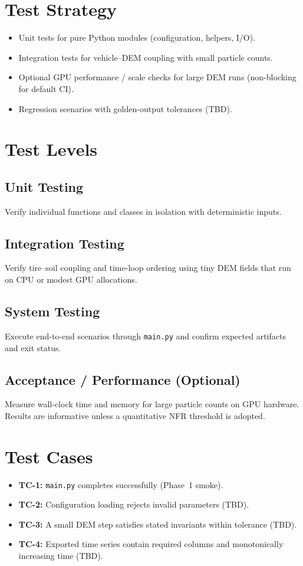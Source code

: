 \documentclass[conference]{IEEEtran}
\begin{document}
\section{Test Strategy}
\begin{itemize}
  \item Unit tests for pure Python modules (configuration, helpers, I/O).
  \item Integration tests for vehicle--DEM coupling with small particle counts.
  \item Optional GPU performance / scale checks for large DEM runs (non-blocking
        for default CI).
  \item Regression scenarios with golden-output tolerances (TBD).
\end{itemize}

\section{Test Levels}

\subsection{Unit Testing}
Verify individual functions and classes in isolation with deterministic inputs.

\subsection{Integration Testing}
Verify tire--soil coupling and time-loop ordering using tiny DEM fields that
run on CPU or modest GPU allocations.

\subsection{System Testing}
Execute end-to-end scenarios through \texttt{main.py} and confirm expected
artifacts and exit status.

\subsection{Acceptance / Performance (Optional)}
Measure wall-clock time and memory for large particle counts on GPU hardware.
Results are informative unless a quantitative NFR threshold is adopted.

\section{Test Cases}
\begin{itemize}
  \item \textbf{TC-1:} \texttt{main.py} completes successfully (Phase~1 smoke).
  \item \textbf{TC-2:} Configuration loading rejects invalid parameters (TBD).
  \item \textbf{TC-3:} A small DEM step satisfies stated invariants within
        tolerance (TBD).
  \item \textbf{TC-4:} Exported time series contain required columns and
        monotonically increasing time (TBD).
\end{itemize}
\end{document}
